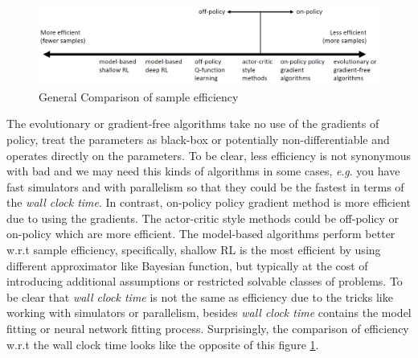 \documentclass{tufte-handout}
\newcommand{\eg}{\textit{e}.\textit{g}. }
\begin{document}
\begin{figure}
  \includegraphics[width=15cm]{sample_efficiency}
  \caption{General Comparison of sample efficiency}
  \label{fig:sample-efficiency}
\end{figure}

The evolutionary or gradient-free algorithms take no use of the gradients of policy, treat the parameters as black-box or potentially non-differentiable and operates directly on the parameters. To be clear, less efficiency is not synonymous with bad and we may need this kinds of algorithms in some cases, \eg you have fast simulators and with parallelism so that they could be the fastest in terms of the \emph{wall clock time}. In contrast, on-policy policy gradient method is more efficient due to using the gradients. The actor-critic style methods could be off-policy or on-policy which are more efficient. The model-based algorithms perform better w.r.t sample efficiency, specifically, shallow RL is the most efficient by using different approximator like Bayesian function, but typically at the cost of introducing additional assumptions or restricted solvable classes of problems. To be clear that \emph{wall clock time} is not the same as efficiency due to the tricks like working with simulators or parallelism, besides \emph{wall clock time} contains the model fitting or neural network fitting process. Surprisingly, the comparison of efficiency w.r.t the wall clock time looks like the opposite of this figure
\ref{fig:sample-efficiency}.
\end{document}
